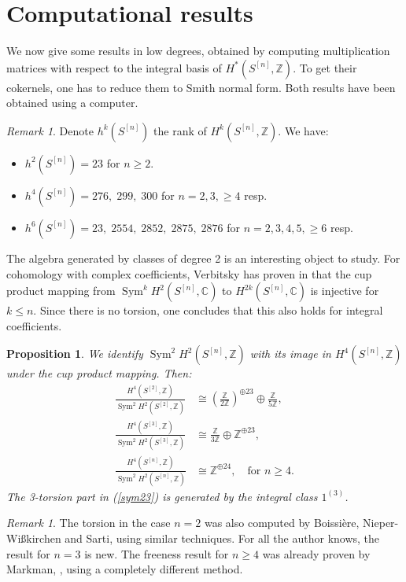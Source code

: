 \documentclass{amsart}
\DeclareMathOperator{\Sym}{Sym}
\newcommand{\hilb}[1]{^{[#1]}}
\newcommand{\IC}{\mathbb{C}}
\newcommand{\IZ}{\mathbb{Z}}
\theoremstyle{plain}
\newtheorem{proposition}[theorem]{Proposition}
\theoremstyle{definition}
\theoremstyle{remark}
\newtheorem{remark}[theorem]{Remark}
\begin{document}
\section{Computational results} \label{CompSection}
We now give some results in low degrees, obtained by computing multiplication matrices with respect to the integral basis of $H^*(S\hilb{n},\IZ)$. To get their cokernels, one has to reduce them to Smith normal form. Both results have been obtained using a computer.
\begin{remark}
Denote $h^k(S\hilb{n})$ the rank of $H^k(S\hilb{n},\IZ)$. We have:
\begin{itemize}
\item $h^2(S\hilb{n}) = 23 $ for $n\geq 2$.
\item $h^4(S\hilb{n}) = 276,\; 299,\; 300$ for $n=2,3, \geq 4$ resp.
\item $h^6(S\hilb{n}) = 23,\; 2554,\; 2852,\; 2875,\; 2876$ for $n=2,3,4,5,\geq6$ resp.
\end{itemize}
\end{remark}
The algebra generated by classes of degree 2 is an interesting object to study. For cohomology with complex coefficients, Verbitsky has proven in \cite{Verbitsky} that the cup product mapping from $\Sym^k H^2(S\hilb{n},\IC)$ to $H^{2k}(S\hilb{n},\IC)$ is injective for $k\leq n$. Since there is no torsion, one concludes that this also holds for integral coefficients.
\begin{proposition} We identify $\Sym^2H^2(S\hilb{n},\IZ)$ with its image in $H^4(S\hilb{n},\IZ)$ under the cup product mapping. Then: 
\setcounter{equation}{0} 
\begin{align}
\frac{H^4(S\hilb{2},\IZ)}{\Sym^2 H^2(S\hilb{2},\IZ)} & \cong \left(\frac{\IZ}{2\IZ}\right)^{\oplus 23} \oplus \frac{\IZ}{5\IZ},\\
\label{sym23}
\frac{H^4(S\hilb{3},\IZ)}{\Sym^2 H^2(S\hilb{3},\IZ)} & \cong \frac{\IZ}{3\IZ} \oplus \IZ^ {\oplus 23}, \\
\frac{H^4(S\hilb{n},\IZ)}{\Sym^2 H^2(S\hilb{n},\IZ)} & \cong  \IZ^ {\oplus 24}, \quad \text{for }n\geq 4.
\end{align}
The 3-torsion part in (\ref{sym23}) is generated by the integral class $1^{(3)}$.
\end{proposition}
\begin{remark}
The torsion in the case $n=2$ was also computed by Boissi\`{e}re, Nieper-Wi\ss kirchen and Sarti, \cite[Prop. 3]{BNS} using similar techniques.
For all the author knows, the result for $n=3$ is new.
The freeness result for $n\geq 4$ was already proven by Markman, \cite[Thm. 1.10]{Markman2}, using a completely different method. 
\end{remark}
\end{document}
